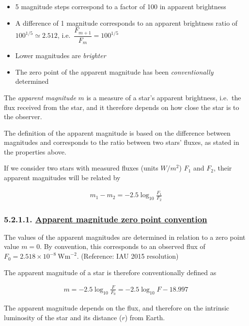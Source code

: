 \documentclass[
  letterpaper,
  DIV=11,
  numbers=noendperiod]{scrreprt}
\providecommand{\tightlist}{%
  \setlength{\itemsep}{0pt}\setlength{\parskip}{0pt}}\usepackage{longtable,booktabs,array}
\begin{document}
\begin{itemize}
\tightlist
\item
  5 magnitude steps correspond to a factor of 100 in apparent brightness
\item
  A difference of 1 magnitude corresponds to an apparent brightness
  ratio of \(100^{1/5}\simeq 2.512\),
  i.e.~\(\dfrac{F_{m+1}}{F_m}=100^{1/5}\)
\item
  Lower magnitudes are \emph{brighter}
\item
  The zero point of the apparent magnitude has been
  \emph{conventionally} determined
\end{itemize}

The \emph{apparent magnitude} \(m\) is a measure of a star's apparent
brightness, i.e.~the flux received from the star, and it therefore
depends on how close the star is to the observer.

The definition of the apparent magnitude is based on the difference
between magnitudes and corresponds to the ratio between two stars'
fluxes, as stated in the properties above.

If we consider two stars with measured fluxes (units \(W/m^2\)) \(F_1\)
and \(F_2\), their apparent magnitudes will be related by

\begin{align}
m_1 - m_2 = -2.5 \log_{10} \frac{F_1}{F_2}
\end{align}

\hypertarget{apparent-magnitude-zero-point-convention}{%
\subsubsection{\texorpdfstring{5.2.1.1.
\protect\hyperlink{toc0_}{Apparent magnitude zero point
convention}}{5.2.1.1. Apparent magnitude zero point convention}}\label{apparent-magnitude-zero-point-convention}}

The values of the apparent magnitudes are determined in relation to a
zero point value \(m=0\). By convention, this corresponds to an observed
flux of \(F_0 = 2.518 × 10^{−8} \ \mathrm{W m}^{−2}\). (Reference: IAU
2015 resolution)

The apparent magnitude of a star is therefore conventionally defined as

\begin{align}
m = -2.5 \log_{10}{\frac{F}{F_0}} = -2.5 \log_{10}{F} - 18.997
\end{align}

The apparent magnitude depends on the flux, and therefore on the
intrinsic luminosity of the star and its distance (\(r\)) from Earth.
\end{document}
